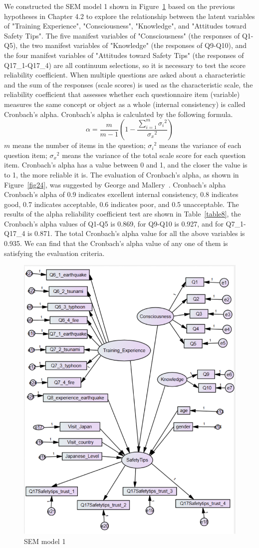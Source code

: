 We constructed the SEM model 1 shown in Figure~\ref{fig23} based on the previous hypotheses in Chapter 4.2 to explore the relationship between the latent variables of "Training Experience", "Consciousness", "Knowledge", and "Attitudes toward Safety Tips". The five manifest variables of "Consciousness" (the responses of Q1-Q5), the two manifest variables of "Knowledge" (the responses of Q9-Q10), and the four manifest variables of  "Attitudes toward Safety Tips" (the responses of Q17\_1-Q17\_4) are all continuum selections, so it is necessary to test the score reliability coefficient. When multiple questions are asked about a characteristic and the sum of the responses (scale scores) is used as the characteristic scale, the reliability coefficient that assesses whether each questionnaire item (variable) measures the same concept or object as a whole (internal consistency) is called Cronbach's alpha. Cronbach's alpha is calculated by the following formula. 
\begin{equation}
\alpha = \frac{m}{m-1} \left(1 - \frac{\displaystyle \sum_{i = 1}^m{{\sigma_i}^2}}{{\sigma_x}^2} \right)
\end{equation}
$m$ means the number of items in the question; ${\sigma_i}^2$ means the variance of each question item; ${\sigma_x}^2$ means the variance of the total scale score for each question item. Cronbach's alpha has a value between 0 and 1, and the closer the value is to 1, the more reliable it is. The evaluation of Cronbach's alpha, as shown in Figure~\ref{fig24}, was suggested by George and Mallery~\cite{ref1}. Cronbach's alpha  Cronbach's alpha of 0.9 indicates excellent internal consistency, 0.8 indicates good, 0.7 indicates acceptable, 0.6 indicates poor, and 0.5 unacceptable. The results of the alpha reliability coefficient test are shown in Table~\ref{table8}, the Cronbach's alpha values of Q1-Q5 is 0.869, for Q9-Q10 is 0.927, and for Q7\_1-Q17\_4 is 0.871. The total Cronbach's alpha value for all the above variables is 0.935. We can find that the Cronbach's alpha value of any one of them is satisfying the evaluation criteria.

\begin{figure}[h]
  \includegraphics[width=0.5\linewidth]{Figure/Figure23.jpg}
  \centering
  \caption{SEM model 1}
  \label{fig23}
\end{figure}

